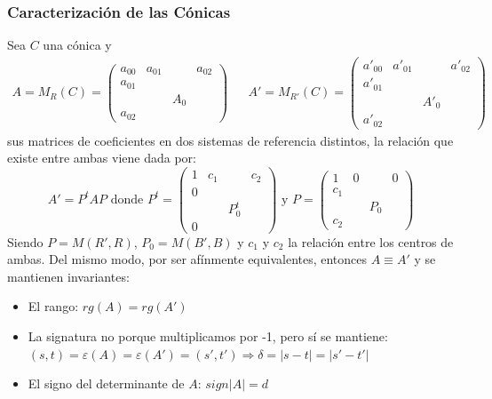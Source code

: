 \documentclass[10pt,a4paper,openright]{book}
\theoremstyle{break}
\begin{document}
\subsubsection{Caracterización de las Cónicas}
Sea $C$ una cónica y
\begin{align*}
A = M_R (C) = \left(\begin{array}{c|ccc}
a_{00} & a_{01}& & a_{02} \\
\hline
a_{01} & & &   \\
 & & A_0 & \\
a_{02} &  & & 
\end{array}
\right) & & A' = M_{R'} (C) = \left(\begin{array}{c|ccc}
a'_{00} & a'_{01}& & a'_{02} \\
\hline
a'_{01} & & &   \\
 & & A'_0 & \\
a'_{02} &  & & 
\end{array}
\right)
\end{align*}
sus matrices de coeficientes en dos sistemas de referencia distintos, la relación que existe entre ambas viene dada por:
$$A' = P^t A P \mbox{ donde } P^t = \left(\begin{array}{c|ccc}
1 & c_1 & & c_2 \\
\hline
0 & & &   \\
 & & P^t_0 & \\
0 &  & & 
\end{array}
\right) \mbox{ y } P= \left(\begin{array}{c|ccc}
1 & 0 && 0 \\
\hline
c_1 & &&   \\
 & & P_0 & \\
c_2 & &&
\end{array}
\right)$$
Siendo $P = M(R', R)$, $P_0 = M (B', B) $ y $c_1$ y $c_2$ la relación entre los centros de ambas. Del mismo modo, por ser afínmente equivalentes, entonces $A \equiv A'$ y se mantienen invariantes:
\begin{itemize}
\item El rango: $rg(A) = rg(A')$
\item La signatura no porque multiplicamos por -1, pero sí se mantiene: $(s,t) = \varepsilon(A) = \varepsilon(A') = (s', t') \Rightarrow \delta = |s - t| = |s' - t'|$
\item El signo del determinante de $A$: $sign|A| = d$
\end{itemize}
\end{document}
